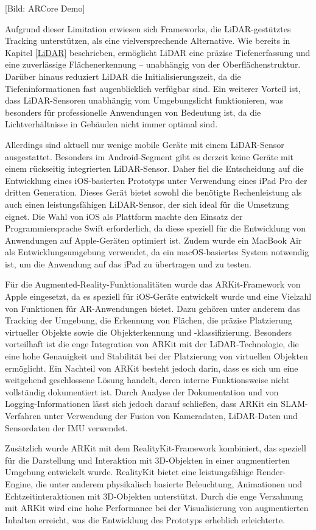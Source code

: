 [Bild: ARCore Demo]

Aufgrund dieser Limitation erwiesen sich Frameworks, die LiDAR-gestütztes Tracking unterstützen, als eine vielversprechende Alternative. Wie bereits in Kapitel \ref{LiDAR} beschrieben, ermöglicht LiDAR eine präzise Tiefenerfassung und eine zuverlässige Flächenerkennung – unabhängig von der Oberflächenstruktur. Darüber hinaus reduziert LiDAR die Initialisierungszeit, da die Tiefeninformationen fast augenblicklich verfügbar sind. Ein weiterer Vorteil ist, dass LiDAR-Sensoren unabhängig vom Umgebungslicht funktionieren, was besonders für professionelle Anwendungen von Bedeutung ist, da die Lichtverhältnisse in Gebäuden nicht immer optimal sind.

Allerdings sind aktuell nur wenige mobile Geräte mit einem LiDAR-Sensor ausgestattet. Besonders im Android-Segment gibt es derzeit keine Geräte mit einem rückseitig integrierten LiDAR-Sensor. Daher fiel die Entscheidung auf die Entwicklung eines iOS-basierten Prototyps unter Verwendung eines iPad Pro der dritten Generation. Dieses Gerät bietet sowohl die benötigte Rechenleistung als auch einen leistungsfähigen LiDAR-Sensor, der sich ideal für die Umsetzung eignet. Die Wahl von iOS als Plattform machte den Einsatz der Programmiersprache Swift erforderlich, da diese speziell für die Entwicklung von Anwendungen auf Apple-Geräten optimiert ist. Zudem wurde ein MacBook Air als Entwicklungsumgebung verwendet, da ein macOS-basiertes System notwendig ist, um die Anwendung auf das iPad zu übertragen und zu testen.

Für die Augmented-Reality-Funktionalitäten wurde das ARKit-Framework von Apple eingesetzt, da es speziell für iOS-Geräte entwickelt wurde und eine Vielzahl von Funktionen für AR-Anwendungen bietet. Dazu gehören unter anderem das Tracking der Umgebung, die Erkennung von Flächen, die präzise Platzierung virtueller Objekte sowie die Objekterkennung und -klassifizierung. Besonders vorteilhaft ist die enge Integration von ARKit mit der LiDAR-Technologie, die eine hohe Genauigkeit und Stabilität bei der Platzierung von virtuellen Objekten ermöglicht. Ein Nachteil von ARKit besteht jedoch darin, dass es sich um eine weitgehend geschlossene Lösung handelt, deren interne Funktionsweise nicht vollständig dokumentiert ist. Durch Analyse der Dokumentation und von Logging-Informationen lässt sich jedoch darauf schließen, dass ARKit ein SLAM-Verfahren unter Verwendung der Fusion von Kameradaten, LiDAR-Daten und Sensordaten der IMU verwendet.

Zusätzlich wurde ARKit mit dem RealityKit-Framework kombiniert, das speziell für die Darstellung und Interaktion mit 3D-Objekten in einer augmentierten Umgebung entwickelt wurde. RealityKit bietet eine leistungsfähige Render-Engine, die unter anderem physikalisch basierte Beleuchtung, Animationen und Echtzeitinteraktionen mit 3D-Objekten unterstützt. Durch die enge Verzahnung mit ARKit wird eine hohe Performance bei der Visualisierung von augmentierten Inhalten erreicht, was die Entwicklung des Prototyps erheblich erleichterte.

